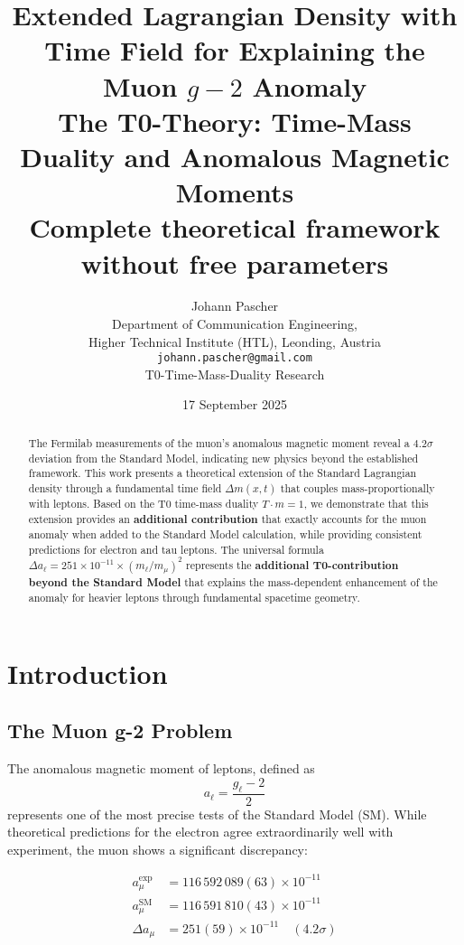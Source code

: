 \documentclass[12pt,a4paper]{article}
\title{\textbf{Extended Lagrangian Density with Time Field for Explaining the Muon \(g-2\) Anomaly}\\[0.5cm]
	\large The T0-Theory: Time-Mass Duality and Anomalous Magnetic Moments\\[0.3cm]
	\normalsize Complete theoretical framework without free parameters}
\author{Johann Pascher\\
	\small Department of Communication Engineering,\\
	\small Higher Technical Institute (HTL), Leonding, Austria\\
	\small \texttt{johann.pascher@gmail.com}\\
	\small T0-Time-Mass-Duality Research}
\date{17 September 2025}
\theoremstyle{definition}
\begin{document}
	\maketitle
	\thispagestyle{fancy}
	
	\begin{abstract}
		The Fermilab measurements of the muon's anomalous magnetic moment reveal a $4.2\sigma$ deviation from the Standard Model, indicating new physics beyond the established framework. This work presents a theoretical extension of the Standard Lagrangian density through a fundamental time field $\Delta m(x,t)$ that couples mass-proportionally with leptons. Based on the T0 time-mass duality $T \cdot m = 1$, we demonstrate that this extension provides an \textbf{additional contribution} that exactly accounts for the muon anomaly when added to the Standard Model calculation, while providing consistent predictions for electron and tau leptons. The universal formula $\Delta a_\ell = 251 \times 10^{-11} \times (m_\ell/m_\mu)^2$ represents the \textbf{additional T0-contribution beyond the Standard Model} that explains the mass-dependent enhancement of the anomaly for heavier leptons through fundamental spacetime geometry.
	\end{abstract}
	
	\section{Introduction}
	
	\subsection{The Muon g-2 Problem}
	
	The anomalous magnetic moment of leptons, defined as
	\begin{equation}
		a_\ell = \frac{g_\ell - 2}{2}
	\end{equation}
	represents one of the most precise tests of the Standard Model (SM). While theoretical predictions for the electron agree extraordinarily well with experiment, the muon shows a significant discrepancy\cite{muong2_fermilab_2021}:
	
	\begin{align}
		a_\mu^{\text{exp}} &= 116\,592\,089(63) \times 10^{-11}\\
		a_\mu^{\text{SM}} &= 116\,591\,810(43) \times 10^{-11}\\
		\Delta a_\mu &= 251(59) \times 10^{-11} \quad (4.2\sigma)
	\end{align}
	
\end{document}
